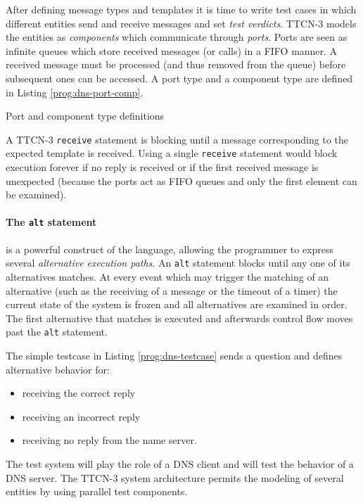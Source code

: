 After defining message types and templates
it is time to write test cases in which different entities
send and receive messages and set \emph{test verdicts}.
\ac{TTCN-3} models the entities as \emph{components}
which communicate through \emph{ports}.
Ports are seen as infinite queues
which store received messages (or calls) in a \ac{FIFO} manner.
A received message must be processed (and thus removed from the queue)
before subsequent ones can be accessed.
A port type and a component type are defined in
Listing \ref{prog:dns-port-comp}.

\begin{program}
\caption{Port and component type definitions\label{prog:dns-port-comp}}
\end{program}

A \ac{TTCN-3} \verb=receive= statement is blocking
until a message corresponding to the expected template is received.
Using a single \verb=receive= statement would block execution forever
if no reply is received or if the first received message is unexpected
(because the ports act as \ac{FIFO} queues
and only the first element can be examined).

\paragraph{The \texttt{alt} statement} is a powerful construct of the language,
allowing the programmer to express several \emph{alternative execution paths}.
An \verb=alt= statement blocks until any one of its alternatives matches.
At every event which may trigger the matching of an alternative
(such as the receiving of a message or the timeout of a timer)
the current state of the system is frozen
and all alternatives are examined in order.
The first alternative that matches is executed
and afterwards control flow moves past the \verb=alt= statement.

The simple testcase in Listing \ref{prog:dns-testcase}
sends a question and defines alternative behavior for:
\begin{itemize}
\item receiving the correct reply
\item receiving an incorrect reply
\item receiving no reply from the name server.
\end{itemize}
The test system will play the role of a \ac{DNS} client
and will test the behavior of a \ac{DNS} server.
The \ac{TTCN-3} system architecture permits the modeling of several entities
by using parallel test components.

